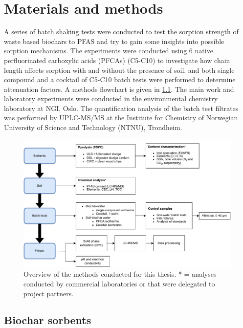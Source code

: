 \chapter{Materials and methods}\label{chap:MatlsMethds}
A series of batch shaking tests were conducted to test the sorption strength of waste based biochars to PFAS and try to gain some insights into possible sorption mechanisms. The experiments were conducted using 6 native perfluorinated carboxylic acids (PFCAs) (C5-C10) to investigate how chain length affects sorption with and without the presence of soil, and both single compound and a cocktail of C5-C10 batch tests were performed to determine attenuation factors. A methods flowchart is given in \cref{fig:methodoverview}. The main work and laboratory experiments were conducted in the environmental chemistry laboratory at NGI, Oslo. The quantification analysis of the batch test filtrates was performed by UPLC-MS/MS at the Institute for Chemistry of Norwegian University of Science and Technology (NTNU), Trondheim. 

\begin{figure}
    \centering
    \includegraphics[width=\textwidth]{Diagrams/Methods-General_overview_methods.pdf}
    \caption{Overview of the methods conducted for this thesis. * = analyses conducted by commercial laboratories or that were delegated to project partners.}
    \label{fig:methodoverview}
\end{figure}

\section{Biochar sorbents}

